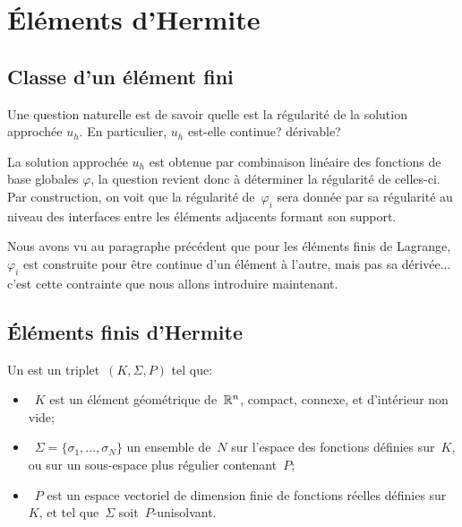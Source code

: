 \medskip
\section{Éléments d'Hermite}

\medskip
\subsection{Classe d'un élément fini}

Une question naturelle est de savoir quelle est la régularité de la solution approchée $u_h$. En particulier, $u_h$ est-elle continue? dérivable?

La solution approchée $u_h$ est obtenue par combinaison linéaire des fonctions de base globales $\varphi$, la question revient donc à déterminer la régularité de celles-ci. Par construction, on voit que la régularité de~$\varphi_i$ sera donnée par sa régularité au niveau des interfaces entre les éléments adjacents formant son support.

Nous avons vu au paragraphe précédent que pour les éléments finis de Lagrange, $\varphi_i$ est construite pour être continue d'un élément à l'autre, mais pas sa dérivée... c'est cette contrainte que nous allons introduire maintenant.


\medskip
\subsection{Éléments finis d'Hermite}

\begin{definition}
Un  est un triplet~$(K, \Sigma, P)$ tel que:
\begin{itemize}
\item~$K$ est un élément géométrique de~$\mathbb R^n$, compact, connexe, et d'intérieur non vide;
\item~$\Sigma=\{\sigma_1,\ldots, \sigma_N\}$ un ensemble de~$N$  sur l'espace des fonctions définies sur~$K$, ou sur un sous-espace plus régulier contenant~$P$;
\item~$P$ est un espace vectoriel de dimension finie de fonctions réelles définies sur~$K$, et tel que~$\Sigma$ soit~$P$-unisolvant.
\end{itemize}
\end{definition}

